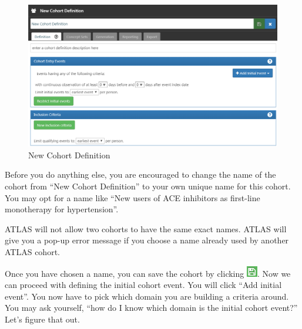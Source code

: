 \documentclass[11pt]{book}
\theoremstyle{definition}
\theoremstyle{definition}
\theoremstyle{definition}
\theoremstyle{remark}
\let\BeginKnitrBlock\begin \let\EndKnitrBlock\end
\begin{document}
\begin{figure}

{\centering \includegraphics[width=1\linewidth]{images/Cohorts/ATLAS-defineacohort} 

}

\caption{New Cohort Definition}\label{fig:ATLASdefineacohort}
\end{figure}

Before you do anything else, you are encouraged to change the name of the cohort from ``New Cohort Definition'' to your own unique name for this cohort. You may opt for a name like ``New users of ACE inhibitors as first-line monotherapy for hypertension''.

\BeginKnitrBlock{rmdimportant}
ATLAS will not allow two cohorts to have the same exact names. ATLAS will give you a pop-up error message if you choose a name already used by another ATLAS cohort.
\EndKnitrBlock{rmdimportant}

Once you have chosen a name, you can save the cohort by clicking \includegraphics{images/Cohorts/save.png}. Now we can proceed with defining the initial cohort event. You will click ``Add initial event''. You now have to pick which domain you are building a criteria around. You may ask yourself, ``how do I know which domain is the initial cohort event?'' Let's figure that out.
\end{document}
